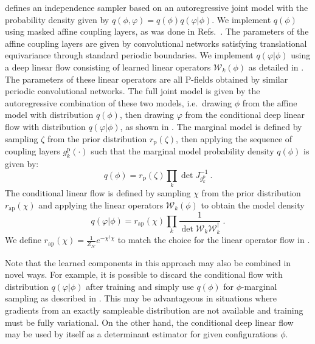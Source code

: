 \documentclass[aps,prd,twocolumn,nofootinbib,superscriptaddress,preprintnumbers]{revtex4-1}
\begin{document}
 defines an independence sampler based on an autoregressive joint model with the probability density given by $q(\phi, \varphi) = q(\phi)q(\varphi | \phi)$. We implement $q(\phi)$ using masked affine coupling layers, as was done in Refs.~\cite{Albergo:2019eim,Kanwar:2020xzo,Boyda:2020hsi}. The parameters of the affine coupling layers are given by convolutional networks satisfying translational equivariance through standard periodic boundaries. We implement $q(\varphi|\phi)$ using a deep linear flow consisting of learned linear operators $\mathcal{W}_k(\phi)$ as detailed in . The parameters of these linear operators are all P-fields obtained by similar periodic convolutional networks. The full joint model is given by the autoregressive combination of these two models, i.e.~drawing $\phi$ from the affine model with distribution $q(\phi)$, then drawing $\varphi$ from the conditional deep linear flow with distribution $q(\varphi|\phi)$, as shown in . The marginal model is defined by sampling $\zeta$ from the prior distribution $r_{\mathrm{p}}(\zeta)$, then applying the sequence of coupling layers $g^{\mathrm{p}}_k(\cdot)$ such that the marginal model probability density $q(\phi)$ is given by:
%
\begin{equation}
    q(\phi) = r_{\mathrm{p}}(\zeta)\prod_k \det J_{g^{\mathrm{p}}_k}^{-1}\ .
\end{equation}
%
The conditional linear flow is defined by sampling $\chi$ from the prior distribution $r_{\mathrm{ap}}(\chi)$ and applying the linear operators $\mathcal{W}_k(\phi)$ to obtain the model density
%
\begin{equation}
    q(\varphi | \phi) = r_{\mathrm{ap}}(\chi) \prod_k \frac{1}{\det \mathcal{W}_k \mathcal{W}^\dagger_k}\ .
\end{equation}
%
We define $r_{\mathrm{ap}}(\chi) = \frac{1}{Z_{\mathcal N}} e^{-\chi^\dagger\chi}$ to match the choice for the linear operator flow in .

Note that the learned components in this approach may also be combined in novel ways. For example, it is possible to discard the conditional flow with distribution $q(\varphi|\phi)$ after training and simply use $q(\phi)$ for $\phi$-marginal sampling as described in . This may be advantageous in situations where gradients from an exactly sampleable distribution are not available and training must be fully variational. On the other hand, the conditional deep linear flow may be used by itself as a determinant estimator for given configurations $\phi$.
\end{document}
